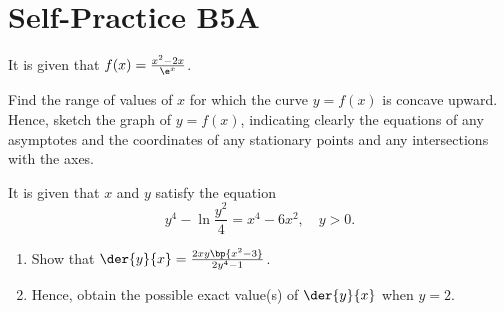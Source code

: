 \section{Self-Practice B5A}

\begin{problem}
    It is given that $f(x) = \frac{x^2 -2 x}{\e^x}$.

    Find the range of values of $x$ for which the curve $y=f(x)$ is concave upward. Hence, sketch the graph of $y=f(x)$, indicating clearly the equations of any asymptotes and the coordinates of any stationary points and any intersections with the axes.
\end{problem}

\begin{problem}
    It is given that $x$ and $y$ satisfy the equation \[y^4 - \ln \frac{y^2}4 = x^4 - 6x^2, \quad y > 0.\]

    \begin{enumerate}
        \item Show that $\der{y}{x} = \frac{2xy\bp{x^2 - 3}}{2y^4 - 1}$.
        \item Hence, obtain the possible exact value(s) of $\der{y}{x}$ when $y=2$.
    \end{enumerate}
\end{problem}

